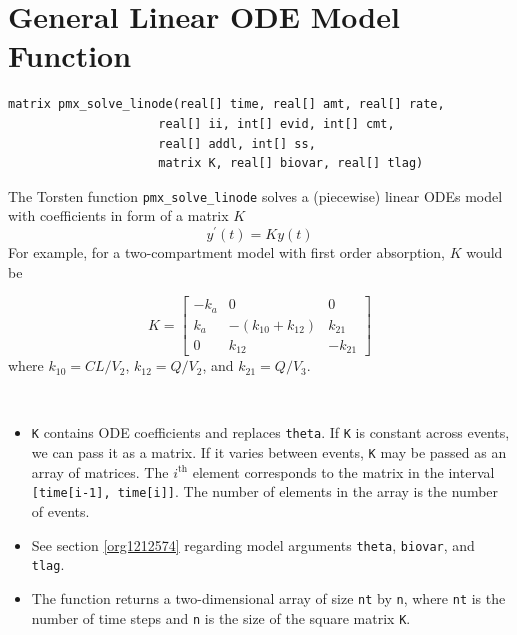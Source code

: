 \documentclass[11pt, reqno, oneside]{amsbook}
\numberwithin{equation}{chapter}
\numberwithin{figure}{chapter}
\numberwithin{table}{chapter}
\theoremstyle{remark}
\begin{document}
\section{General Linear ODE Model Function}
\label{sec:org8a5da18}
\begin{verbatim}
matrix pmx_solve_linode(real[] time, real[] amt, real[] rate,
                     real[] ii, int[] evid, int[] cmt,
                     real[] addl, int[] ss,
                     matrix K, real[] biovar, real[] tlag)
\end{verbatim}
The Torsten function \texttt{pmx\_solve\_linode} 
solves a (piecewise) linear ODEs model with coefficients
in form of a matrix \(K\)
%
\begin{equation}
y^\prime\left(t\right) = Ky\left(t\right)
\end{equation}
%
For example, for a two-compartment model with first order absorption, \(K\) would be

\begin{equation}
  K = \left[\begin{array}{ccc}
              -k_a & 0 & 0 \\
              k_a & -\left(k_{10} + k_{12}\right) & k_{21} \\
              0 & k_{12} & -k_{21}
            \end{array}\right]
\end{equation}
%
where \(k_{10}=CL/V_2\), \(k_{12}=Q/V_2\), and \(k_{21}=Q/V_3\).

\ \\
\begin{itemize}
\item \texttt{K} contains ODE coefficients and replaces \texttt{theta}. 
If \texttt{K} is constant across events, we can pass it as a matrix.
If it varies between events, \texttt{K} may be passed as an array of matrices.
The $i^\mathrm{th}$ element corresponds to the matrix in the interval \texttt{[time[i-1], time[i]]}.
The number of elements in the array is the number of events.
\item See section \ref{org1212574} regarding model arguments \texttt{theta},
\texttt{biovar}, and \texttt{tlag}.
\item The function returns a two-dimensional array of size \texttt{nt}
by \texttt{n}, where \texttt{nt} is the number of time steps and
\texttt{n} is the size of the square matrix \texttt{K}.
\end{itemize}
\end{document}
